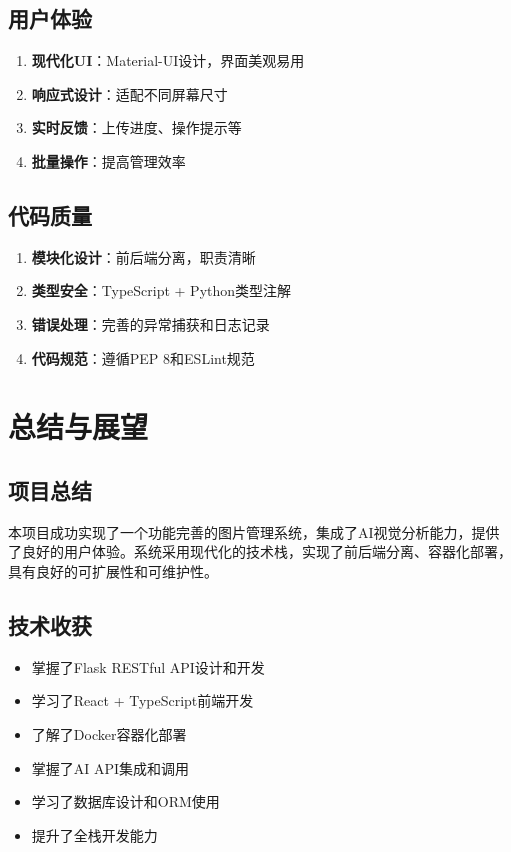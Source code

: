 \documentclass[12pt,a4paper]{article}
\begin{document}
\subsection{用户体验}
\begin{enumerate}
    \item \textbf{现代化UI}：Material-UI设计，界面美观易用
    \item \textbf{响应式设计}：适配不同屏幕尺寸
    \item \textbf{实时反馈}：上传进度、操作提示等
    \item \textbf{批量操作}：提高管理效率
\end{enumerate}

\subsection{代码质量}
\begin{enumerate}
    \item \textbf{模块化设计}：前后端分离，职责清晰
    \item \textbf{类型安全}：TypeScript + Python类型注解
    \item \textbf{错误处理}：完善的异常捕获和日志记录
    \item \textbf{代码规范}：遵循PEP 8和ESLint规范
\end{enumerate}

\section{总结与展望}

\subsection{项目总结}

本项目成功实现了一个功能完善的图片管理系统，集成了AI视觉分析能力，提供了良好的用户体验。系统采用现代化的技术栈，实现了前后端分离、容器化部署，具有良好的可扩展性和可维护性。

\subsection{技术收获}

\begin{itemize}
    \item 掌握了Flask RESTful API设计和开发
    \item 学习了React + TypeScript前端开发
    \item 了解了Docker容器化部署
    \item 掌握了AI API集成和调用
    \item 学习了数据库设计和ORM使用
    \item 提升了全栈开发能力
\end{itemize}
\end{document}
